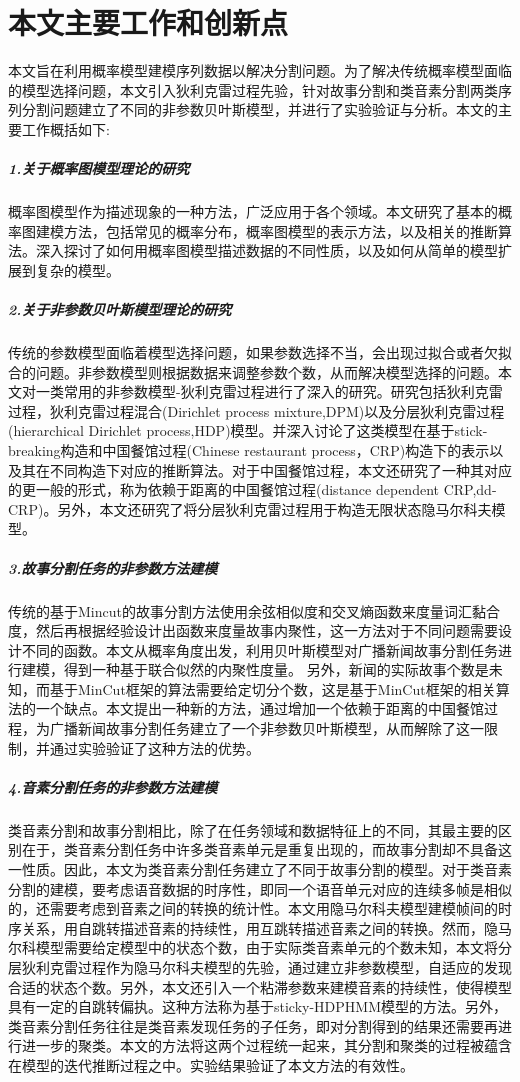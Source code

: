 \section{本文主要工作和创新点}
本文旨在利用概率模型建模序列数据以解决分割问题。为了解决传统概率模型面临的模型选择问题，本文引入狄利克雷过程先验，针对故事分割和类音素分割两类序列分割问题建立了不同的非参数贝叶斯模型，并进行了实验验证与分析。本文的主要工作概括如下:
\vspace{-2pt}
\subparagraph{1.关于概率图模型理论的研究}
概率图模型作为描述现象的一种方法，广泛应用于各个领域。本文研究了基本的概率图建模方法，包括常见的概率分布，概率图模型的表示方法，以及相关的推断算法。深入探讨了如何用概率图模型描述数据的不同性质，以及如何从简单的模型扩展到复杂的模型。
\vspace{-2pt}
\subparagraph{2.关于非参数贝叶斯模型理论的研究}
传统的参数模型面临着模型选择问题，如果参数选择不当，会出现过拟合或者欠拟合的问题。非参数模型则根据数据来调整参数个数，从而解决模型选择的问题。本文对一类常用的非参数模型-狄利克雷过程进行了深入的研究。研究包括狄利克雷过程，狄利克雷过程混合(Dirichlet process mixture,DPM)以及分层狄利克雷过程(hierarchical Dirichlet process,HDP)模型。并深入讨论了这类模型在基于stick-breaking构造和中国餐馆过程(Chinese restaurant process，CRP)构造下的表示以及其在不同构造下对应的推断算法。对于中国餐馆过程，本文还研究了一种其对应的更一般的形式，称为依赖于距离的中国餐馆过程(distance dependent CRP,dd-CRP)。另外，本文还研究了将分层狄利克雷过程用于构造无限状态隐马尔科夫模型。
\vspace{-2pt}
\subparagraph{3.故事分割任务的非参数方法建模}
传统的基于Mincut的故事分割方法使用余弦相似度和交叉熵函数来度量词汇黏合度，然后再根据经验设计出函数来度量故事内聚性，这一方法对于不同问题需要设计不同的函数。本文从概率角度出发，利用贝叶斯模型对广播新闻故事分割任务进行建模，得到一种基于联合似然的内聚性度量。
另外，新闻的实际故事个数是未知，而基于MinCut框架的算法需要给定切分个数，这是基于MinCut框架的相关算法的一个缺点。本文提出一种新的方法，通过增加一个依赖于距离的中国餐馆过程，为广播新闻故事分割任务建立了一个非参数贝叶斯模型，从而解除了这一限制，并通过实验验证了这种方法的优势。
\vspace{-2pt}
\subparagraph{4.音素分割任务的非参数方法建模}
类音素分割和故事分割相比，除了在任务领域和数据特征上的不同，其最主要的区别在于，类音素分割任务中许多类音素单元是重复出现的，而故事分割却不具备这一性质。因此，本文为类音素分割任务建立了不同于故事分割的模型。对于类音素分割的建模，要考虑语音数据的时序性，即同一个语音单元对应的连续多帧是相似的，还需要考虑到音素之间的转换的统计性。本文用隐马尔科夫模型建模帧间的时序关系，用自跳转描述音素的持续性，用互跳转描述音素之间的转换。然而，隐马尔科模型需要给定模型中的状态个数，由于实际类音素单元的个数未知，本文将分层狄利克雷过程作为隐马尔科夫模型的先验，通过建立非参数模型，自适应的发现合适的状态个数。另外，本文还引入一个粘滞参数来建模音素的持续性，使得模型具有一定的自跳转偏执。这种方法称为基于sticky-HDPHMM模型的方法。另外，类音素分割任务往往是类音素发现任务的子任务，即对分割得到的结果还需要再进行进一步的聚类。本文的方法将这两个过程统一起来，其分割和聚类的过程被蕴含在模型的迭代推断过程之中。实验结果验证了本文方法的有效性。

